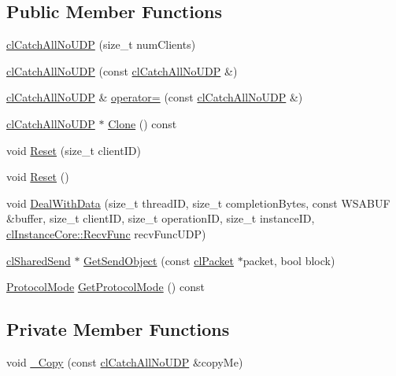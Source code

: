 \subsection*{Public Member Functions}
\begin{DoxyCompactItemize}
\item 
\hyperlink{classcl_catch_all_no_u_d_p_a0f0afccf0237b04676b9cb1cc460b7b8}{clCatchAllNoUDP} (size\_\-t numClients)
\item 
\hyperlink{classcl_catch_all_no_u_d_p_a8fec259a6e1598bb600672f9c59211f3}{clCatchAllNoUDP} (const \hyperlink{classcl_catch_all_no_u_d_p}{clCatchAllNoUDP} \&)
\item 
\hyperlink{classcl_catch_all_no_u_d_p}{clCatchAllNoUDP} \& \hyperlink{classcl_catch_all_no_u_d_p_ad6eb8cb12e29758e295b69fe9c73a012}{operator=} (const \hyperlink{classcl_catch_all_no_u_d_p}{clCatchAllNoUDP} \&)
\item 
\hyperlink{classcl_catch_all_no_u_d_p}{clCatchAllNoUDP} $\ast$ \hyperlink{classcl_catch_all_no_u_d_p_a64c2a0db2dffeb144559bb2c134c4aa0}{Clone} () const 
\item 
void \hyperlink{classcl_catch_all_no_u_d_p_af80b84880abeb4cc701c4facd4391156}{Reset} (size\_\-t clientID)
\item 
void \hyperlink{classcl_catch_all_no_u_d_p_a5b4b52daa2fe9319eb25481951a70818}{Reset} ()
\item 
void \hyperlink{classcl_catch_all_no_u_d_p_a85b8bad42a00da200b572fb8f8f142c5}{DealWithData} (size\_\-t threadID, size\_\-t completionBytes, const WSABUF \&buffer, size\_\-t clientID, size\_\-t operationID, size\_\-t instanceID, \hyperlink{classcl_instance_core_afa96c2a2c0b26b6a9256b87798bf9587}{clInstanceCore::RecvFunc} recvFuncUDP)
\item 
\hyperlink{classcl_shared_send}{clSharedSend} $\ast$ \hyperlink{classcl_catch_all_no_u_d_p_ab617cfaf8427e415c591518fe36b95af}{GetSendObject} (const \hyperlink{classcl_packet}{clPacket} $\ast$packet, bool block)
\item 
\hyperlink{classcl_shared_protocol_a4b0b9c82b8ae4eee78c6308c35afd47b}{ProtocolMode} \hyperlink{classcl_catch_all_no_u_d_p_a93dceb605e7c892975772958e91f44b4}{GetProtocolMode} () const 
\end{DoxyCompactItemize}
\subsection*{Private Member Functions}
\begin{DoxyCompactItemize}
\item 
void \hyperlink{classcl_catch_all_no_u_d_p_a42c6c3dca9de2a8374acd134ad0aca3b}{\_\-Copy} (const \hyperlink{classcl_catch_all_no_u_d_p}{clCatchAllNoUDP} \&copyMe)
\end{DoxyCompactItemize}
